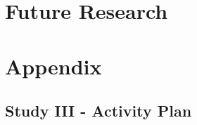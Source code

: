 \chapter{Future Research}



\label{lastpage}

\appendix
\chapter{Appendix}
\section{Study III - Activity Plan}
\label{ap3}



